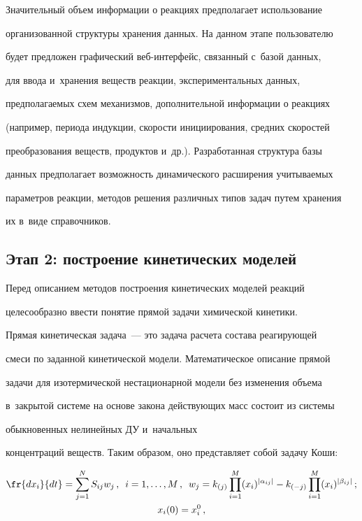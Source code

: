   


  Значительный объем информации о реакциях предполагает использование 


организованной структуры хранения данных. На данном этапе пользователю 


будет предложен графический веб-ин\-тер\-фейс, связанный с~базой данных, 


для ввода и~хранения веществ реакции, экспериментальных данных, 


предполагаемых схем механизмов, дополнительной информации о реакциях 


(например, периода индукции, скорости инициирования, средних скоростей 


преобразования веществ, продуктов и~др.). Разработанная структура базы 


данных предполагает возможность динамического расширения учитываемых 


параметров реакции, методов решения различных типов задач путем хранения 


их в~виде справочников.


  


  \subsection*{Этап 2: построение кинетических моделей}


  


  Перед описанием методов построения кинетических моделей реакций 


целесообразно ввести понятие прямой задачи химической кинетики.


  


  Прямая кинетическая задача~--- это задача расчета состава реагирующей 


смеси по заданной кинетической модели. Математическое описание прямой 


задачи для изотермической нестационарной модели без изменения объема 


в~закрытой системе на основе закона действующих масс состоит из системы 


обыкновенных нелинейных ДУ и~начальных 


концентраций веществ. Таким образом, оно представляет собой задачу Коши:


  \begin{gather}


  \fr{dx_i}{dt} =\sum\limits_{j=1}^N S_{ij} w_j\,,\enskip i=1,\ldots , M\,,\enskip 


w_j=k_{(j)} \prod\limits_{i=1}^M (x_i)^{\vert \alpha_{ij}\vert}- k_{(-j)} 


\prod\limits_{i=1}^M (x_i)^{\vert\beta_{ij}\vert}\,;\label{e1-en}\\


  x_i(0)=x_i^0\,,\label{e2-en}


  \end{gather}


